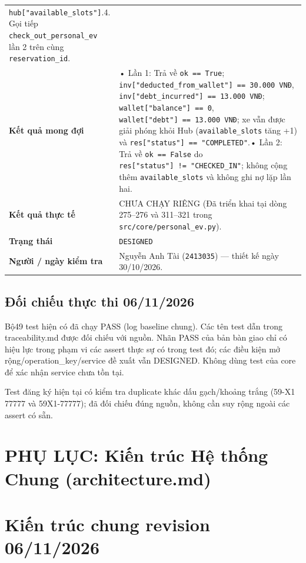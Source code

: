 \documentclass[11pt,a4paper]{article}
\begin{document}
\begin{longtable}[]{@{}
  >{\raggedright\arraybackslash}p{}
  >{\raggedright\arraybackslash}p{}@{}}
\texttt{hub{[}"available\_slots"{]}}.4. Gọi tiếp
\texttt{check\_out\_personal\_ev} lần 2 trên cùng
\texttt{reservation\_id}. \\
\textbf{Kết quả mong đợi} & • Lần 1: Trả về \texttt{ok\ ==\ True};
\texttt{inv{[}"deducted\_from\_wallet"{]}\ ==\ 30.000\ VNĐ},
\texttt{inv{[}"debt\_incurred"{]}\ ==\ 13.000\ VNĐ};
\texttt{wallet{[}"balance"{]}\ ==\ 0},
\texttt{wallet{[}"debt"{]}\ ==\ 13.000\ VNĐ}; xe vẫn được giải phóng
khỏi Hub (\texttt{available\_slots} tăng +1) và
\texttt{res{[}"status"{]}\ ==\ "COMPLETED"}.• Lần 2: Trả về
\texttt{ok\ ==\ False} do \texttt{res{[}"status"{]}\ !=\ "CHECKED\_IN"};
không cộng thêm \texttt{available\_slots} và không ghi nợ lặp lần
hai. \\
\textbf{Kết quả thực tế} & CHƯA CHẠY RIÊNG (Đã triển khai tại dòng
275--276 và 311--321 trong \texttt{src/core/personal\_ev.py}). \\
\textbf{Trạng thái} & \texttt{DESIGNED} \\
\textbf{Người / ngày kiểm tra} & Nguyễn Anh Tài (\texttt{2413035}) ---
thiết kế ngày 30/10/2026. \\
\end{longtable}

\hypertarget{ux111ux1ed1i-chiux1ebfu-thux1ef1c-thi-06112026}{%
\subsection{Đối chiếu thực thi
06/11/2026}\label{ux111ux1ed1i-chiux1ebfu-thux1ef1c-thi-06112026}}

Bộ49 test hiện có đã chạy PASS (log baseline chung). Các tên test dẫn
trong traceability.md được đối chiếu với nguồn. Nhãn PASS của bản bàn
giao chỉ có hiệu lực trong phạm vi các assert thực sự có trong test đó;
các điều kiện mở rộng/operation\_key/service đề xuất vẫn DESIGNED. Không
dùng test của core để xác nhận service chưa tồn tại.

Test đăng ký hiện tại có kiểm tra duplicate khác dấu gạch/khoảng trắng
(59-X1 77777 và 59X1-77777); đã đối chiếu đúng nguồn, không cần suy rộng
ngoài các assert có sẵn.

\newpage
\section*{PHỤ LỤC: Kiến trúc Hệ thống Chung (architecture.md)}
\hypertarget{kiux1ebfn-truxfac-chung-revision-06112026}{%
\section{Kiến trúc chung revision
06/11/2026}\label{kiux1ebfn-truxfac-chung-revision-06112026}}
\end{document}
